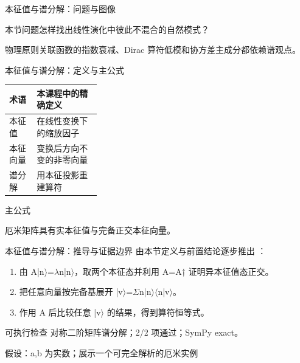 \begin{frame}[t]{本征值与谱分解：问题与图像}
\footnotesize
\begin{block}{本节问题}怎样找出线性演化中彼此不混合的自然模式？\end{block}
\begin{block}{物理原则}\quad 关联函数的指数衰减、Dirac 算符低模和协方差主成分都依赖谱观点。\end{block}
\end{frame}

\begin{frame}[t]{本征值与谱分解：定义与主公式}
\footnotesize\begin{tabularx}{\linewidth}{p{0.30\linewidth}Y}
\toprule 术语 & 本课程中的精确定义\\\midrule
{} 本征值 & 在线性变换下的缩放因子\\
 本征向量 & 变换后方向不变的非零向量\\
 谱分解 & 用本征投影重建算符\\
\bottomrule\end{tabularx}\vspace{0.15cm}
\begin{block}{ 主公式}\centering{}\end{block}
厄米矩阵具有实本征值与完备正交本征向量。
\end{frame}

\begin{frame}[t]{本征值与谱分解：推导与证据边界}
\footnotesize
{}\quad 由本节定义与前置结论逐步推出 ：
\begin{enumerate}
\item 由 A|n\ensuremath{\rangle}=\ensuremath{\lambda}n|n\ensuremath{\rangle}，取两个本征态并利用 A=A† 证明异本征值态正交。
\item 把任意向量按完备基展开 |v\ensuremath{\rangle}=\ensuremath{\Sigma}n|n\ensuremath{\rangle}\ensuremath{\langle}n|v\ensuremath{\rangle}。
\item 作用 A 后比较任意 |v\ensuremath{\rangle} 的结果，得到算符恒等式。
\end{enumerate}\begin{block}{可执行检查}
\quad 对称二阶矩阵谱分解；2/2 项通过；SymPy exact。
\par\scriptsize 假设：a,b 为实数；展示一个可完全解析的厄米实例
\end{block}
\end{frame}

